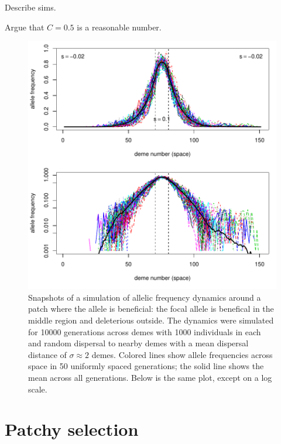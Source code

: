 \documentclass{article}
\begin{document}
Describe sims.

Argue that $C=0.5$ is a reasonable number.

\begin{figure}[ht!]
    \begin{center}
        \includegraphics{example-equilibrium}
    \end{center}
    \label{fig:example_equil}
    \caption{
    Snapshots of a simulation of allelic frequency dynamics around a patch where the allele is beneficial:
    the focal allele is benefical in the middle region and deleterious outside.
    The dynamics were simulated for 10000 generations across demes with 1000 individuals in each
    and random dispersal to nearby demes with a mean dispersal distance of $\sigma \approx 2$ demes.
    Colored lines show allele frequencies across space in 50 uniformly spaced generations;
    the solid line shows the mean across all generations.
    Below is the same plot, except on a log scale.
    }
\end{figure}

\section{Patchy selection} 
\label{ss:discretedemes}
\end{document}
